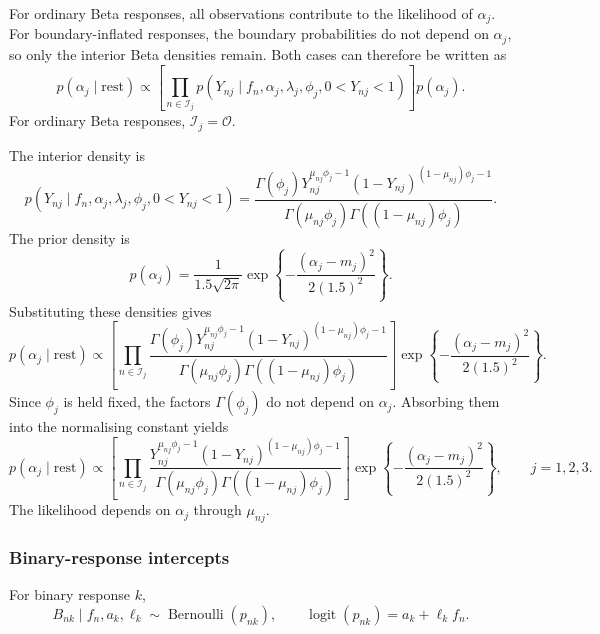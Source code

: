\documentclass[pdftex,12pt,openright,a4paper,oneside]{book}
\begin{document}
For ordinary Beta responses, all observations
contribute to the likelihood of $\alpha_j$.
For boundary-inflated responses, the boundary
probabilities do not depend on $\alpha_j$,
so only the interior Beta densities remain.
Both cases can therefore be written as
\begin{equation*}
p(\alpha_j\mid\mathrm{rest})
\propto
\left[
\prod_{n\in\mathcal{I}_j}
p(Y_{nj}\mid f_n,\alpha_j,\lambda_j,\phi_j,
0<Y_{nj}<1)
\right]
p(\alpha_j).
\end{equation*}
For ordinary Beta responses,
$\mathcal{I}_j=\mathcal{O}$.

The interior density is
\begin{equation*}
p(Y_{nj}\mid f_n,\alpha_j,\lambda_j,\phi_j,
0<Y_{nj}<1)=
\frac{
\Gamma(\phi_j)
Y_{nj}^{\mu_{nj}\phi_j-1}
(1-Y_{nj})^{(1-\mu_{nj})\phi_j-1}
}{
\Gamma(\mu_{nj}\phi_j)
\Gamma((1-\mu_{nj})\phi_j)
}.
\end{equation*}
The prior density is
\begin{equation*}
p(\alpha_j)=
\frac{1}{1.5\sqrt{2\pi}}
\exp\!\left\{
-\frac{(\alpha_j-m_j)^2}{2(1.5)^2}
\right\}.
\end{equation*}
Substituting these densities gives
\begin{equation*}
p(\alpha_j\mid\mathrm{rest})
\propto 
\left[
\prod_{n\in\mathcal{I}_j}
\frac{
\Gamma(\phi_j)
Y_{nj}^{\mu_{nj}\phi_j-1}
(1-Y_{nj})^{(1-\mu_{nj})\phi_j-1}
}{
\Gamma(\mu_{nj}\phi_j)
\Gamma((1-\mu_{nj})\phi_j)
}
\right]
\exp\!\left\{
-\frac{(\alpha_j-m_j)^2}{2(1.5)^2}
\right\}.
\end{equation*}
Since $\phi_j$ is held fixed, the factors
$\Gamma(\phi_j)$ do not depend on $\alpha_j$.
Absorbing them into the normalising constant yields
\begin{equation*}
p(\alpha_j\mid\mathrm{rest})
\propto 
\left[
\prod_{n\in\mathcal{I}_j}
\frac{
Y_{nj}^{\mu_{nj}\phi_j-1}
(1-Y_{nj})^{(1-\mu_{nj})\phi_j-1}
}{
\Gamma(\mu_{nj}\phi_j)
\Gamma((1-\mu_{nj})\phi_j)
}
\right]
\exp\!\left\{
-\frac{(\alpha_j-m_j)^2}{2(1.5)^2}
\right\},
\qquad j=1,2,3.
\end{equation*}
The likelihood depends on $\alpha_j$ through $\mu_{nj}$.


\subsubsection{Binary-response intercepts}

For binary response $k$,
\begin{equation*}
B_{nk}\mid f_n,a_k,\ell_k
\sim\operatorname{Bernoulli}(p_{nk}),
\qquad
\operatorname{logit}(p_{nk})
=
a_k+\ell_kf_n.
\end{equation*}
\end{document}
